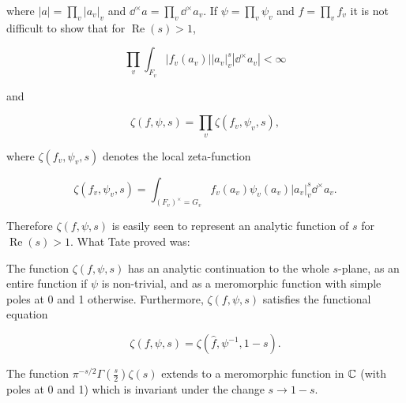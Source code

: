 where $|a| = \prod_v |a_v|_v$ and $\dd^{\times} a = \prod_v \dd^{\times} a_v$. If $\psi = \prod_v \psi_v$ and $f = \prod_v f_v$ it is not difficult to show that for $\operatorname{Re}(s) > 1$,

\begin{equation}\label{eq:6.12}
\prod_v \int_{F_v} |f_v(a_v)| |a_v|_v^s |\dd^{\times} a_v| < \infty\tag{6.12}
\end{equation}

and

\begin{equation}\label{eq:6.13}
\zeta(f, \psi, s) = \prod_v \zeta(f_v, \psi_v, s),\tag{6.13}
\end{equation}

where $\zeta(f_v, \psi_v, s)$ denotes the local zeta-function

\begin{equation}\label{eq:6.14}
\zeta(f_v, \psi_v, s) = \int_{(F_v)^{\times} = G_v} f_v(a_v)\psi_v(a_v) |a_v|_v^s \dd^{\times} a_v.\tag{6.14}
\end{equation}

Therefore $\zeta(f, \psi, s)$ is easily seen to represent an analytic function of $s$ for $\operatorname{Re}(s) > 1$. What Tate proved was:

\begin{theorem}\label{thm:6.3}

The function $\zeta(f, \psi, s)$ has an analytic continuation to the whole $s$-plane, as an entire function if $\psi$ is non-trivial, and as a meromorphic function with simple poles at 0 and 1 otherwise. Furthermore, $\zeta(f, \psi, s)$ satisfies the functional equation

\begin{equation}\label{eq:6.15}
\zeta(f, \psi, s) = \zeta(\hat{f}, \psi^{-1}, 1 - s).\tag{6.15}
\end{equation}

\end{theorem}

\begin{corollary}\label{cor:6.4}

The function $\pi^{-s/2}\Gamma\left(\frac{s}{2}\right)\zeta(s)$ extends to a meromorphic function in $\mathbb{C}$ (with poles at 0 and 1) which is invariant under the change $s \to 1 - s$.

\end{corollary}

